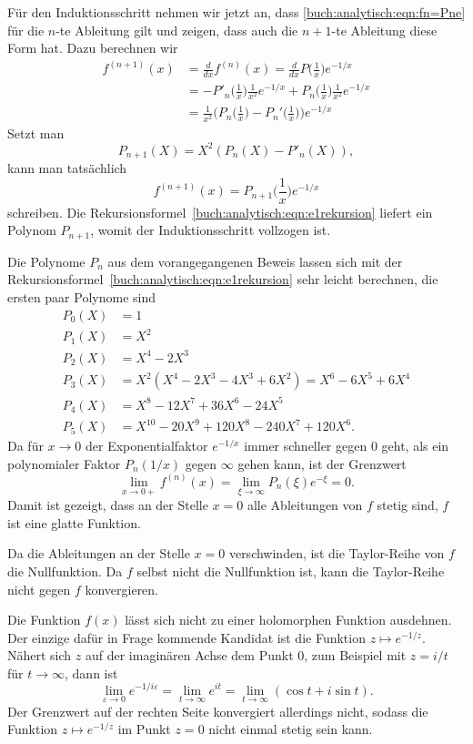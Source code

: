 Für den Induktionsschritt nehmen wir jetzt an, dass 
\eqref{buch:analytisch:eqn:fn=Pne}
für die $n$-te Ableitung gilt und zeigen, dass auch die $n+1$-te
Ableitung diese Form hat.
Dazu berechnen wir
\begin{align*}
f^{(n+1)}(x)
&=
\frac{d}{dx}
f^{(n)}(x)
=
\frac{d}{dx} P\biggl(\frac1x\biggr) e^{-1/x}
\\
&=
-P'_n\biggl(\frac1x\biggr) \frac{1}{x^2} e^{-1/x}
+
P_n\biggl(\frac1x\biggr) \frac{1}{x^2} e^{-1/x}
\\
&=
\frac{1}{x^2}
\biggl(
P_n\biggl(\frac1x\biggr)
-
P_n'\biggl(\frac1x\biggr)
\biggr)e^{-1/x}
\end{align*}
Setzt man 
\begin{equation}
P_{n+1}(X)
=
X^2(P_n(X) - P'_n(X)),
\label{buch:analytisch:eqn:e1rekursion}
\end{equation}
kann man tatsächlich
\[
f^{(n+1)}(x)
=
P_{n+1}\biggl(\frac1x\biggr)e^{-1/x}
\]
schreiben.
Die Rekursionsformel~\eqref{buch:analytisch:eqn:e1rekursion}
liefert ein Polynom $P_{n+1}$, womit der Induktionsschritt vollzogen
ist.

Die Polynome $P_n$ aus dem vorangegangenen Beweis lassen sich
mit der Rekursionsformel~\eqref{buch:analytisch:eqn:e1rekursion}
sehr leicht berechnen, die ersten paar Polynome sind
\begin{align*}
P_0(X) &= 1 \\
P_1(X) &= X^2 \\
P_2(X) &= X^4 - 2X^3 \\
P_3(X) &= X^2 (X^4 - 2X^3 - 4X^3 + 6X^2) = X^6 -6X^5+6X^4 \\
P_4(X) &= X^8 -12X^7+36X^6-24X^5 \\
P_5(X) &= X^{10} -20X^9 +120 X^8 - 240X^7 + 120 X^6.
\end{align*}
Da für $x\to 0$ der Exponentialfaktor $e^{-1/x}$ immer schneller
gegen $0$ geht, als ein polynomialer Faktor $P_n(1/x)$ gegen $\infty$
gehen kann, ist der Grenzwert 
\[
\lim_{x\to 0+}
f^{(n)}(x)
=
\lim_{\xi\to \infty}
P_n(\xi) e^{-\xi}
=
0.
\]
Damit ist gezeigt, dass an der Stelle $x=0$ alle Ableitungen von $f$
stetig sind, $f$ ist eine glatte Funktion.

Da die Ableitungen an der Stelle $x=0$ verschwinden, ist die
Taylor-Reihe von $f$ die Nullfunktion.
Da $f$ selbst nicht die Nullfunktion ist, kann die Taylor-Reihe
nicht gegen $f$ konvergieren.

Die Funktion $f(x)$ lässt sich nicht zu einer holomorphen Funktion
ausdehnen.
Der einzige dafür in Frage kommende Kandidat ist die Funktion
$z\mapsto e^{-1/z}$.
Nähert sich $z$ auf der imaginären Achse dem Punkt $0$, zum Beispiel
mit $z=i/t$ für $t\to \infty$, dann ist
\[
\lim_{\varepsilon\to 0} e^{-1/i\varepsilon}
=
\lim_{t\to\infty} e^{it}
=
\lim_{t\to\infty}(\cos t + i\sin t).
\]
Der Grenzwert auf der rechten Seite konvergiert allerdings nicht, sodass
die Funktion $z\mapsto e^{-1/z}$ im Punkt $z=0$ nicht einmal stetig
sein kann.

